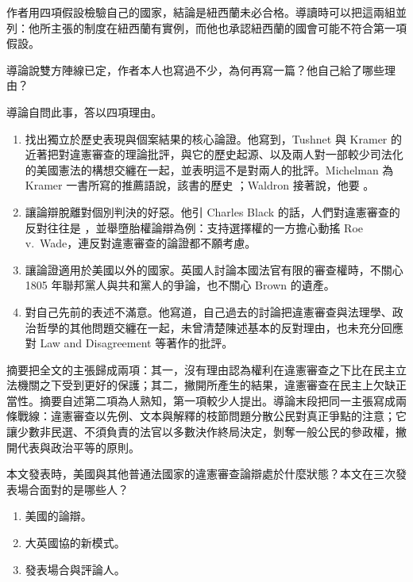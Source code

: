 \begin{readernote}
作者用四項假設檢驗自己的國家，結論是紐西蘭未必合格。導讀時可以把這兩組並列：他所主張的制度在紐西蘭有實例，而他也承認紐西蘭的國會可能不符合第一項假設。
\end{readernote}


\begin{qaquestion}
導論說雙方陣線已定，作者本人也寫過不少，為何再寫一篇？他自己給了哪些理由？
\end{qaquestion}

導論自問此事，答以四項理由。

\begin{enumerate}
\item 找出獨立於歷史表現與個案結果的核心論證。他寫到，Tushnet 與 Kramer 的近著把對違憲審查的理論批評，與它的歷史起源、以及兩人對一部較少司法化的美國憲法的構想交纏在一起，並表明這不是對兩人的批評。Michelman 為 Kramer 一書所寫的推薦語說，該書的歷史 ；Waldron 接著說，他要 。
\item 讓論辯脫離對個別判決的好惡。他引 Charles Black 的話，人們對違憲審查的反對往往是 ，並舉墮胎權論辯為例：支持選擇權的一方擔心動搖 Roe v.\ Wade，連反對違憲審查的論證都不願考慮。
\item 讓論證適用於美國以外的國家。英國人討論本國法官有限的審查權時，不關心 1805 年聯邦黨人與共和黨人的爭論，也不關心 Brown 的遺產。
\item 對自己先前的表述不滿意。他寫道，自己過去的討論把違憲審查與法理學、政治哲學的其他問題交纏在一起，未曾清楚陳述基本的反對理由，也未充分回應對 Law and Disagreement 等著作的批評。
\end{enumerate}

摘要把全文的主張歸成兩項：其一，沒有理由認為權利在違憲審查之下比在民主立法機關之下受到更好的保護；其二，撇開所產生的結果，違憲審查在民主上欠缺正當性。摘要自述第二項為人熟知，第一項較少人提出。導論末段把同一主張寫成兩條戰線：違憲審查以先例、文本與解釋的枝節問題分散公民對真正爭點的注意；它讓少數非民選、不須負責的法官以多數決作終局決定，剝奪一般公民的參政權，撇開代表與政治平等的原則。


\begin{qaquestion}
本文發表時，美國與其他普通法國家的違憲審查論辯處於什麼狀態？本文在三次發表場合面對的是哪些人？
\begin{enumerate}
\item 美國的論辯。
\item 大英國協的新模式。
\item 發表場合與評論人。
\end{enumerate}
\end{qaquestion}

